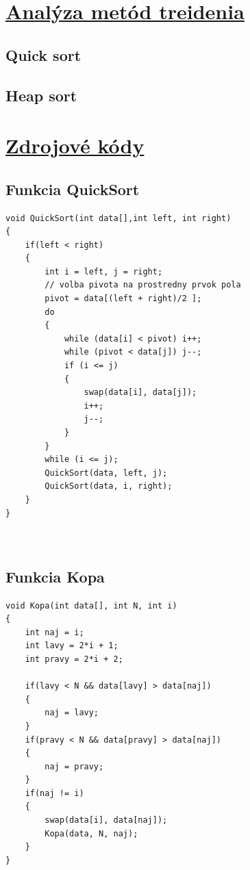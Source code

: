 \documentclass[12pt]{article}
\begin{document}
\section{\underline{Analýza metód treidenia}}
    \subsection*{Quick sort}
    \subsection*{Heap sort}
\section{\underline{Zdrojové kódy}}
    \subsection*{Funkcia QuickSort}

    \begin{lstlisting}
void QuickSort(int data[],int left, int right)
{
    if(left < right)
    {
        int i = left, j = right;
        // volba pivota na prostredny prvok pola
        pivot = data[(left + right)/2 ]; 
        do
        {
            while (data[i] < pivot) i++;
            while (pivot < data[j]) j--;
            if (i <= j)
            {
                swap(data[i], data[j]);
                i++;
                j--;
            }
        }
        while (i <= j);
        QuickSort(data, left, j);
        QuickSort(data, i, right);
    }
}
    
    
    \end{lstlisting}
    
    \subsection*{Funkcia Kopa}

    \begin{lstlisting}
void Kopa(int data[], int N, int i)
{
    int naj = i;
    int lavy = 2*i + 1;
    int pravy = 2*i + 2;

    if(lavy < N && data[lavy] > data[naj])
    {
        naj = lavy;
    }
    if(pravy < N && data[pravy] > data[naj])
    {
        naj = pravy;
    }
    if(naj != i)
    {
        swap(data[i], data[naj]);
        Kopa(data, N, naj);
    }
}
    
    
    \end{lstlisting}
\end{document}
